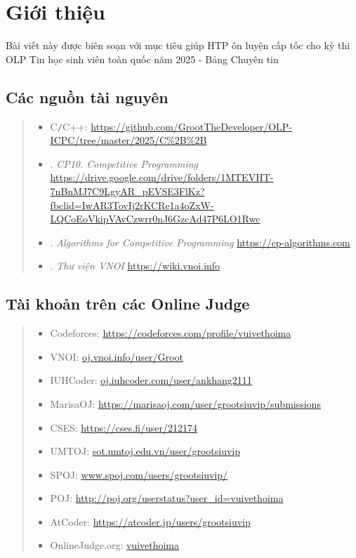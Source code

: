 \chapter{Giới thiệu}
\minitoc 

Bài viết này được biên soạn với mục tiêu giúp HTP ôn luyện cấp tốc cho kỳ thi OLP Tin học sinh viên toàn quốc năm 2025 - Bảng Chuyên tin

\section{Các nguồn tài nguyên}
\begin{quote}
    \begin{itemize}
        \item C{\tt/}C++: \url{https://github.com/GrootTheDeveloper/OLP-ICPC/tree/master/2025/C%2B%2B}
        \item \cite{CP10}. \textit{CP10. Competitive Programming} \url{https://drive.google.com/drive/folders/1MTEVHT-7nBnMJ7C9LgyAR_pEVSE3FlKz?fbclid=IwAR3TovIj2rKCRe1a4oZxW-LQCoEoVkipVAvCzwrr0nJ6GzcAd47P6LO1Rwc}
	
        \item \cite{cp-algorithms}. \textit{Algorithms for Competitive Programming} \url{https://cp-algorithms.com}

        \item \cite{VNOI-WIKI}. \textit{Thư viện VNOI} \url{https://wiki.vnoi.info}
    \end{itemize}
\end{quote}

\section{Tài khoản trên các Online Judge}
\begin{quote}
    \begin{itemize}
        \item Codeforces: \url{https://codeforces.com/profile/vuivethoima}
        \item VNOI: \url{oj.vnoi.info/user/Groot}
        \item IUHCoder: \url{oj.iuhcoder.com/user/ankhang2111}
        \item MarisaOJ: \url{https://marisaoj.com/user/grootsiuvip/submissions}
        \item CSES: \url{https://cses.fi/user/212174}
        \item UMTOJ: \url{sot.umtoj.edu.vn/user/grootsiuvip}
        \item SPOJ: \url{www.spoj.com/users/grootsiuvip/}
        \item POJ: \url{http://poj.org/userstatus?user_id=vuivethoima}
        \item AtCoder: \url{https://atcoder.jp/users/grootsiuvip}
        \item OnlineJudge.org: \url{vuivethoima}
    \end{itemize}
\end{quote}

